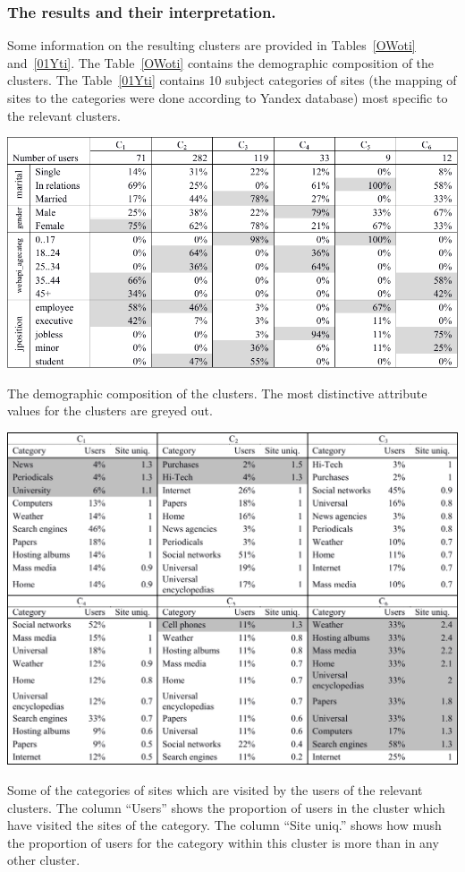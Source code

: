 \documentclass[runningheads,a4paper]{llncs}
\begin{document}
\subsubsection{The results and their interpretation.}

Some information on the resulting clusters are provided in Tables~\ref{OWoti} and~\ref{01Yti}. The Table~\ref{OWoti} contains the demographic composition of the clusters. The Table~\ref{01Yti} contains 10 subject categories of sites (the mapping of sites to the categories were done according to Yandex database) most specific to the relevant clusters.


\begin{table}
	\includegraphics[width=\linewidth]{t1.pdf}
	
	\caption{The demographic composition of the clusters. The most distinctive attribute values for the clusters are greyed out.}
	\label{OWoti}
\end{table}





\begin{table}
	\includegraphics[width=\linewidth]{t2.pdf}
	
	\caption{Some of the categories of sites which are visited by the users of the relevant clusters. The column ``Users'' shows the proportion of users in the cluster which have visited the sites of the category. The column ``Site uniq.'' shows how mush the proportion of users for the category within this cluster is more than in any other cluster. }
	\label{01Yti}
\end{table}
\end{document}
